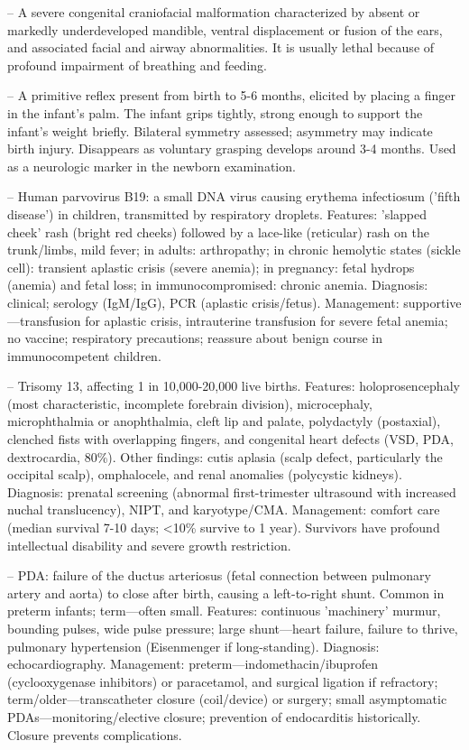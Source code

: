 -- A severe congenital craniofacial malformation characterized by absent or markedly underdeveloped mandible, ventral displacement or fusion of the ears, and associated facial and airway abnormalities. It is usually lethal because of profound impairment of breathing and feeding.

-- A primitive reflex present from birth to 5-6 months, elicited by placing a finger in the infant's palm. The infant grips tightly, strong enough to support the infant's weight briefly. Bilateral symmetry assessed; asymmetry may indicate birth injury. Disappears as voluntary grasping develops around 3-4 months. Used as a neurologic marker in the newborn examination.

-- Human parvovirus B19: a small DNA virus causing erythema infectiosum ('fifth disease') in children, transmitted by respiratory droplets. Features: 'slapped cheek' rash (bright red cheeks) followed by a lace-like (reticular) rash on the trunk/limbs, mild fever; in adults: arthropathy; in chronic hemolytic states (sickle cell): transient aplastic crisis (severe anemia); in pregnancy: fetal hydrops (anemia) and fetal loss; in immunocompromised: chronic anemia. Diagnosis: clinical; serology (IgM/IgG), PCR (aplastic crisis/fetus). Management: supportive—transfusion for aplastic crisis, intrauterine transfusion for severe fetal anemia; no vaccine; respiratory precautions; reassure about benign course in immunocompetent children.

-- Trisomy 13, affecting 1 in 10,000-20,000 live births. Features: holoprosencephaly (most characteristic, incomplete forebrain division), microcephaly, microphthalmia or anophthalmia, cleft lip and palate, polydactyly (postaxial), clenched fists with overlapping fingers, and congenital heart defects (VSD, PDA, dextrocardia, 80\%). Other findings: cutis aplasia (scalp defect, particularly the occipital scalp), omphalocele, and renal anomalies (polycystic kidneys). Diagnosis: prenatal screening (abnormal first-trimester ultrasound with increased nuchal translucency), NIPT, and karyotype/CMA. Management: comfort care (median survival 7-10 days; <10\% survive to 1 year). Survivors have profound intellectual disability and severe growth restriction.

-- PDA: failure of the ductus arteriosus (fetal connection between pulmonary artery and aorta) to close after birth, causing a left-to-right shunt. Common in preterm infants; term—often small. Features: continuous 'machinery' murmur, bounding pulses, wide pulse pressure; large shunt—heart failure, failure to thrive, pulmonary hypertension (Eisenmenger if long-standing). Diagnosis: echocardiography. Management: preterm—indomethacin/ibuprofen (cyclooxygenase inhibitors) or paracetamol, and surgical ligation if refractory; term/older—transcatheter closure (coil/device) or surgery; small asymptomatic PDAs—monitoring/elective closure; prevention of endocarditis historically. Closure prevents complications.

